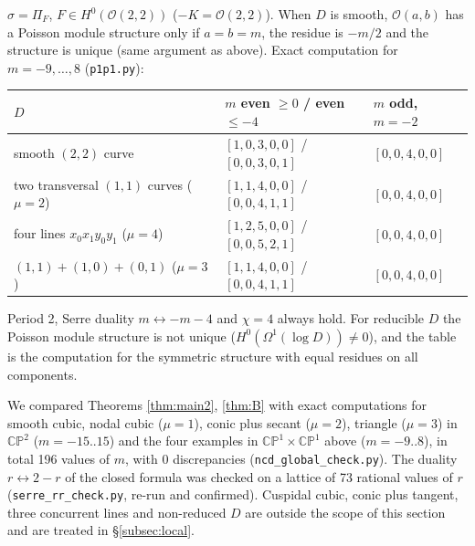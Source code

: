 \begin{ex}\tP \tV\label{ex:p1p1}
$\sigma=\Pi_F$, $F\in H^0(\mathcal O(2,2))$ ($-K=\mathcal O(2,2)$). When $D$ is smooth, $\mathcal O(a,b)$ has a Poisson module structure only if $a=b=m$, the residue is $-m/2$ and the structure is unique (same argument as above). Exact computation for $m=-9,\dots,8$ (\texttt{p1p1.py}):
\begin{center}\small
\begin{tabular}{lll}\toprule
$D$ & $m$ even $\ge0$ / even $\le-4$ & $m$ odd, $m=-2$\\\midrule
smooth $(2,2)$ curve & $[1,0,3,0,0]$ / $[0,0,3,0,1]$ & $[0,0,4,0,0]$\\
two transversal $(1,1)$ curves ($\mu=2$) & $[1,1,4,0,0]$ / $[0,0,4,1,1]$ & $[0,0,4,0,0]$\\
four lines $x_0x_1y_0y_1$ ($\mu=4$) & $[1,2,5,0,0]$ / $[0,0,5,2,1]$ & $[0,0,4,0,0]$\\
$(1,1)+(1,0)+(0,1)$ ($\mu=3$) & $[1,1,4,0,0]$ / $[0,0,4,1,1]$ & $[0,0,4,0,0]$\\\bottomrule
\end{tabular}
\end{center}
Period 2, Serre duality $m\leftrightarrow-m-4$ and $\chi=4$ always hold. For reducible $D$ the Poisson module structure is not unique ($H^0(\Omega^1(\log D))\ne0$), and the table is the computation for the symmetric structure with equal residues on all components.
\end{ex}
\tV We compared Theorems \ref{thm:main2}, \ref{thm:B} with exact computations for smooth cubic, nodal cubic ($\mu=1$), conic plus secant ($\mu=2$), triangle ($\mu=3$) in $\mathbb{CP}^2$ ($m=-15..15$) and the four examples in $\mathbb{CP}^1\times\mathbb{CP}^1$ above ($m=-9..8$), in total 196 values of $m$, with 0 discrepancies (\texttt{ncd\_global\_check.py}). The duality $r\leftrightarrow2-r$ of the closed formula was checked on a lattice of 73 rational values of $r$ (\texttt{serre\_rr\_check.py}, re-run and confirmed). Cuspidal cubic, conic plus tangent, three concurrent lines and non-reduced $D$ are outside the scope of this section and are treated in \S\ref{subsec:local}.

